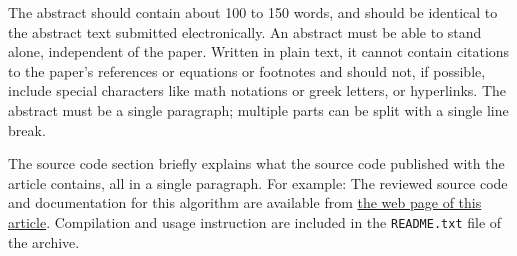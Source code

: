 \documentclass{ipol}
\begin{document}



\begin{ipolAbstract}
The abstract should contain about 100 to 150 words, and should be
identical to the abstract text submitted electronically. An abstract
must be able to stand alone, independent of the paper.  Written in
plain text, it cannot contain citations to the paper’s references or
equations or footnotes and should not, if possible, include special
characters like math notations or greek letters, or hyperlinks. The
abstract must be a single paragraph; multiple parts can be split with
a single line break.
\end{ipolAbstract}


\begin{ipolCode}
The source code section briefly explains what the source code
published with the article contains, all in a single paragraph. For
example: The reviewed source code and documentation for this algorithm
are available from \href{\ipolLink}{the web page of this
  article}. Compilation and usage instruction are included in the
\verb|README.txt| file of the archive.
\end{ipolCode}


\end{document}
